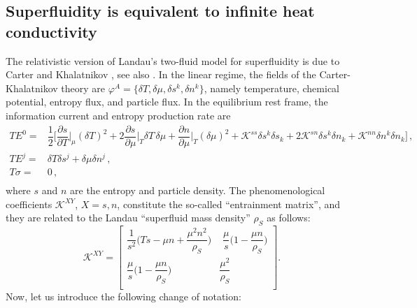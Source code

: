 \documentclass[a4paper, amsfonts, amssymb, amsmath, reprint, showkeys, nofootinbib, twoside, onecolumn,notitlepage]{revtex4-1}
\begin{document}
\subsection{Superfluidity is equivalent to infinite heat conductivity}\label{entrainment} 

The relativistic version of Landau's two-fluid model  for superfluidity \cite{landau6,khalatnikov_book} is due to Carter \cite{carter1991,cool1995,langlois98} and Khalatnikov \cite{lebedev1982,Carter_starting_point,carter92}, see also \cite{Son2001,Gusakov2007,andersson2007review,
GavassinoIordanskii2021}. In the linear regime, the fields of the Carter-Khalatnikov theory are $\varphi^A=\{ \delta T, \delta \mu, \delta s^k, \delta n^k \}$, namely temperature, chemical potential, entropy flux, and particle flux. In the equilibrium rest frame, the information current and entropy production rate are \cite{GavassinoStabilityCarter2022,GavassinoCasmir2022} 
\begin{equation}\label{infosup}
\begin{split}
TE^0 ={}& \dfrac{1}{2} \bigg[\dfrac{\partial s}{\partial T}\bigg|_{\mu}  \! (\delta T)^2 + 2 \dfrac{\partial s}{\partial \mu}\bigg|_{T}  \! \delta T \, \delta \mu + \dfrac{\partial n}{\partial \mu}\bigg|_{T} \!(\delta \mu)^2 + \mathcal{K}^{ss}\delta s^k \delta s_k + 2\mathcal{K}^{sn}\delta s^k \delta n_k + \mathcal{K}^{nn}\delta n^k \delta n_k  \bigg] \, , \\
TE^j ={}& \delta T \delta s^j +\delta \mu \delta n^j \, , \\
T\sigma ={}& 0 \, , \\
\end{split}
\end{equation}
where $s$ and $n$ are the entropy and particle density. The phenomenological coefficients $\mathcal{K}^{XY}$, $X=s,n$, constitute the so-called ``entrainment matrix'', and they are related to the Landau ``superfluid mass density'' $\rho_S$ \cite{landau9} as follows:
\begin{equation}\label{entratevoi!}
\mathcal{K}^{XY}= 
\begin{bmatrix}
  \dfrac{1}{s^2}\bigg(Ts-\mu n + \dfrac{\mu^2n^2}{\rho_S}\bigg) & \, \, \dfrac{\mu}{s} \bigg( 1-\dfrac{\mu n}{\rho_S} \bigg)  \\
   \dfrac{\mu}{s} \bigg( 1-\dfrac{\mu n}{\rho_S} \bigg) &  \dfrac{\mu^2}{\rho_S} \\
\end{bmatrix} .
\end{equation}
Now, let us introduce the following change of notation:
\end{document}
